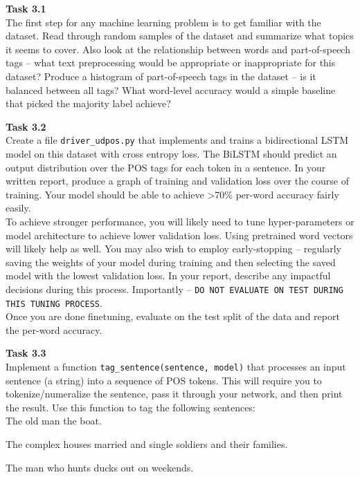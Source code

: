 \documentclass[12pt,article]{article}
\newenvironment{task}[2][Task]
    { \begin{mdframed}[backgroundcolor=gray!20] \textbf{#1 #2} \\}
    {  \end{mdframed}}
\begin{document}
\newpage
\begin{task}{3.1} 
The first step for any machine learning problem is to get familiar with the dataset. Read through random samples of the dataset and summarize what topics it seems to cover. Also look at the relationship between words and part-of-speech tags -- what text preprocessing would be appropriate or inappropriate for this dataset? Produce a histogram of part-of-speech tags in the dataset -- is it balanced between all tags? What word-level accuracy would a simple baseline that  picked the majority label achieve?
\end{task}

\begin{task}{3.2} 
Create a file \texttt{driver\_udpos.py} that implements and trains a bidirectional LSTM model on this dataset with cross entropy loss. The BiLSTM should predict an output distribution over the POS tags for each token in a sentence. In your written report, produce a graph of training and validation loss over the course of training. Your model should be able to achieve >70\% per-word accuracy fairly easily. \\[5pt] 

To achieve stronger performance, you will likely need to tune hyper-parameters or model architecture to achieve lower validation loss. Using pretrained word vectors will likely help as well. You may also wish to employ early-stopping -- regularly saving the weights of your model during training and then selecting the saved model with the lowest validation loss. In your report, describe any impactful decisions during this process. Importantly -- \texttt{DO NOT EVALUATE ON TEST DURING THIS TUNING PROCESS}.\\[5pt]

Once you are done finetuning, evaluate on the test split of the data and report the per-word accuracy. 
\end{task}

\begin{task}{3.3} 
Implement a function \texttt{tag\_sentence(sentence, model)} that processes an input sentence (a string) into a sequence of POS tokens. This will require you to tokenize/numeralize the sentence, pass it through your network, and then print the result. Use this function to tag the following sentences:\\[5pt]

The old man the boat.

The complex houses married and single soldiers and their families.

The man who hunts ducks out on weekends.    
\end{task}



\end{document}
